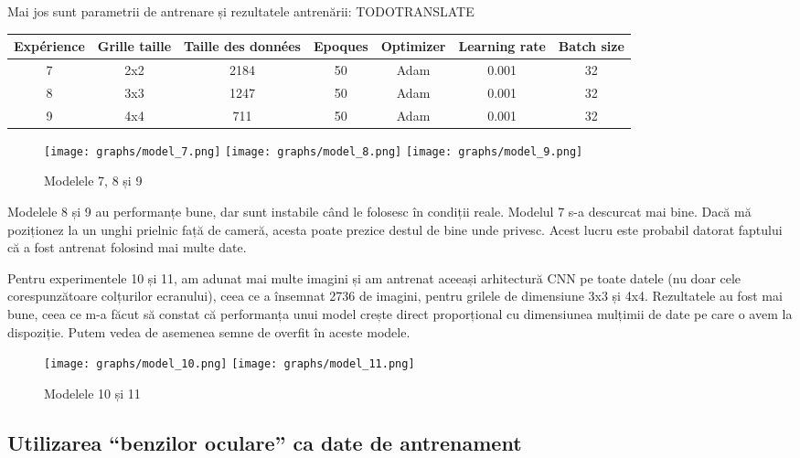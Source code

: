 Mai jos sunt parametrii de antrenare și rezultatele antrenării:
TODOTRANSLATE

\begin{center}
    \begin{tabular}{ c | c | c | c | c | c | c }
        \hline
        Expérience & Grille taille & Taille des données & Epoques & Optimizer & Learning rate & Batch size \\ 
        \hline
        7 & 2x2 & 2184 & 50 & Adam & 0.001 & 32 \\
        \hline
        8 & 3x3 & 1247 & 50 & Adam & 0.001 & 32 \\
        \hline
        9 & 4x4 & 711 & 50 & Adam & 0.001 & 32 \\
        \hline
    \end{tabular}
\end{center}

\begin{figure}[h]
    \centering
    \texttt{[image: graphs/model\_7.png]}
    \texttt{[image: graphs/model\_8.png]}
    \texttt{[image: graphs/model\_9.png]}
    \caption{Modelele 7, 8 și 9}
\end{figure}


Modelele 8 și 9 au performanțe bune, dar sunt instabile când le folosesc în condiții reale.
Modelul 7 s-a descurcat mai bine.
Dacă mă poziționez la un unghi prielnic față de cameră, acesta poate prezice destul de bine unde privesc.
Acest lucru este probabil datorat faptului că a fost antrenat folosind mai multe date.


Pentru experimentele 10 și 11, am adunat mai multe imagini și am antrenat aceeași arhitectură CNN pe toate datele (nu doar cele corespunzătoare colțurilor ecranului), ceea ce a însemnat 2736 de imagini, pentru grilele de dimensiune 3x3 și 4x4.
Rezultatele au fost mai bune, ceea ce m-a făcut să constat că performanța unui model crește direct proporțional cu dimensiunea mulțimii de date pe care o avem la dispoziție.
Putem vedea de asemenea semne de overfit în aceste modele.

\begin{figure}
    \centering
    \texttt{[image: graphs/model\_10.png]}
    \texttt{[image: graphs/model\_11.png]}
    \caption{Modelele 10 și 11}
\end{figure}

\subsection{Utilizarea ``benzilor oculare'' ca date de antrenament}

